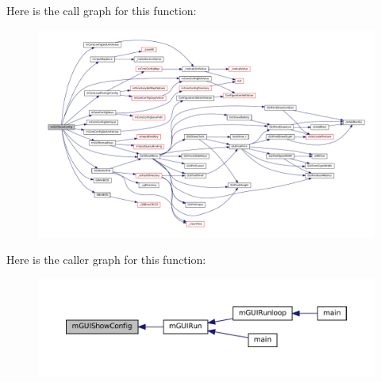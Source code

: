 Here is the call graph for this function\+:
\nopagebreak
\begin{figure}[H]
\begin{center}
\leavevmode
\includegraphics[width=350pt]{gui-config_8c_a505ebe8c0708157c31aff0d023cb6631_cgraph}
\end{center}
\end{figure}
Here is the caller graph for this function\+:
\nopagebreak
\begin{figure}[H]
\begin{center}
\leavevmode
\includegraphics[width=350pt]{gui-config_8c_a505ebe8c0708157c31aff0d023cb6631_icgraph}
\end{center}
\end{figure}

